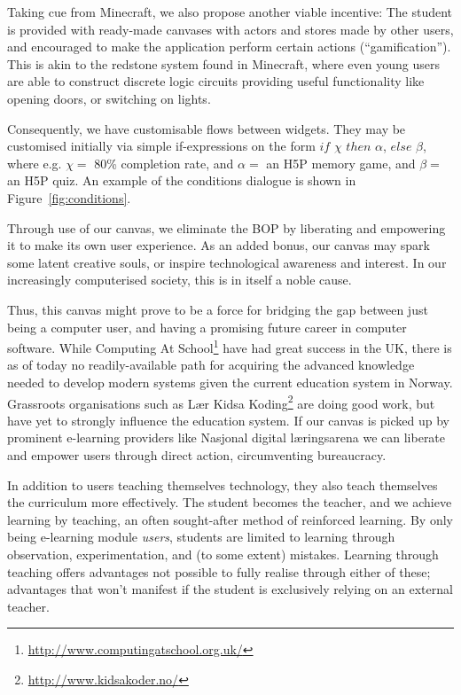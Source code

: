 Taking cue from Minecraft, we also propose another viable incentive: The 
student is provided with ready-made canvases with actors and stores made by 
other users, and encouraged to make the application perform certain actions 
(``gamification''). This is akin to the redstone system found in Minecraft, 
where even young users are able to construct discrete logic circuits providing 
useful functionality like opening doors, or switching on 
lights\cite{brand2013crafting}.

Consequently, we have customisable flows between widgets. They may be 
customised initially via simple if-expressions on the form $if$ $\chi$ $then$ 
$\alpha$, $else$ $\beta$, where e.g. $\chi=$ 80\% completion rate, and 
$\alpha=$ an H5P memory game, and $\beta=$ an H5P quiz. An example of the 
conditions dialogue is shown in Figure~\ref{fig:conditions}.

Through use of our canvas, we eliminate the BOP by liberating and empowering 
it to make its own user experience. As an added bonus, our canvas may spark 
some latent creative souls, or inspire technological awareness and interest. 
In our increasingly computerised society, this is in itself a noble cause. 

Thus, this canvas might prove to be a force for bridging the gap between just 
being a computer user, and having a promising future career in computer 
software. While Computing At 
School\footnote{\url{http://www.computingatschool.org.uk/}} have had great 
success in the UK, there is as of today no readily-available path for 
acquiring the advanced knowledge needed to develop modern systems given the 
current education system in Norway. Grassroots organisations such as Lær Kidsa 
Koding\footnote{\url{http://www.kidsakoder.no/}} are doing good work, but have 
yet to strongly influence the education system. If our canvas is picked up by 
prominent e-learning providers like Nasjonal digital læringsarena we can 
liberate and empower users through direct action, circumventing bureaucracy.

In addition to users teaching themselves technology, they also teach 
themselves the curriculum more effectively. The student becomes the teacher, 
and we achieve learning by teaching, an often sought-after method of 
reinforced learning. By only being e-learning module \emph{users}, students 
are limited to learning through observation, experimentation, and (to some 
extent) mistakes. Learning through teaching offers advantages not possible to 
fully realise through either of these; advantages that won't manifest if the 
student is exclusively relying on an external 
teacher\cite{cortese2005learning}.

